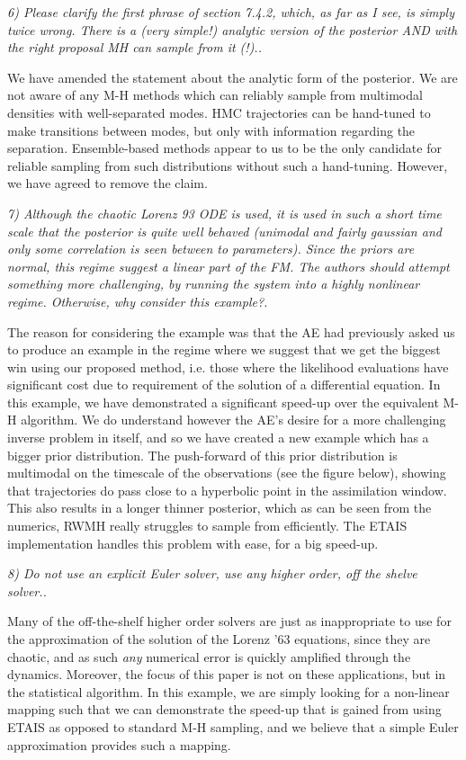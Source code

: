 \documentclass{article}
\newcommand{\comment}[2]{\vspace{0.6cm}{\bf Comment:} {\it #1.}

\vspace{0.3cm}{\bf Answer:} #2}
\begin{document}
\comment{6) Please clarify the first phrase of section 7.4.2, which, as far as I see, is simply twice wrong. There is a (very simple!) analytic version of the posterior AND with the right proposal MH can sample from it (!).}{We have amended the statement about the analytic form of the posterior. We are not aware of any M-H methods which can reliably sample from multimodal densities with well-separated modes. HMC trajectories can be hand-tuned to make transitions between modes, but only with information regarding the separation. Ensemble-based methods appear to us to be the only candidate for reliable sampling from such distributions without such a hand-tuning. However, we have agreed to remove the claim.}

\comment{7) Although the chaotic Lorenz 93 ODE is used, it is used in such a short time scale that the posterior is quite well behaved (unimodal and fairly gaussian and only some correlation is seen between to parameters). Since the priors are normal, this regime suggest a linear part of the FM. The authors should attempt something more challenging, by running the system into a highly nonlinear regime. Otherwise, why consider this example?}{The reason for considering the example was that the AE had previously asked us to produce an example in the regime where we suggest that we get the biggest win using our proposed method, i.e. those where the likelihood evaluations have significant cost due to requirement of the solution of a differential equation. In this example, we have demonstrated a significant speed-up over the equivalent M-H algorithm. We do understand however the AE's desire for a more challenging inverse problem in itself, and so we have created a new example which has a bigger prior distribution. The push-forward of this prior distribution is multimodal on the timescale of the observations (see the figure below), showing that trajectories do pass close to a hyperbolic point in the assimilation window. This also results in a longer thinner posterior, which as can be seen from the numerics, RWMH really struggles to sample from efficiently. The ETAIS implementation handles this problem with ease, for a big speed-up.}

\comment{8) Do not use an explicit Euler solver, use any higher order, off the shelve solver.}{Many of the off-the-shelf higher order solvers are just as inappropriate to use for the approximation of the solution of the Lorenz '63 equations, since they are chaotic, and as such \emph{any} numerical error is quickly amplified through the dynamics. Moreover, the focus of this paper is not on these applications, but in the statistical algorithm. In this example, we are simply looking for a non-linear mapping such that we can demonstrate the speed-up that is gained from using ETAIS as opposed to standard M-H sampling, and we believe that a simple Euler approximation provides such a mapping.}
\end{document}

